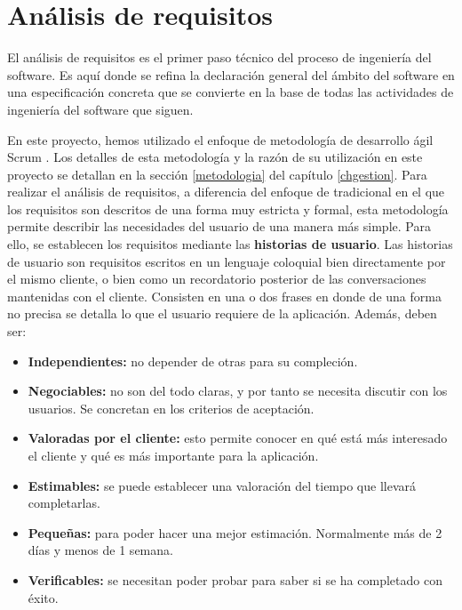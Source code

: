 
\chapter{Análisis de requisitos}
El análisis de requisitos es el primer paso técnico del proceso de ingeniería del software. Es aquí donde se refina la declaración general del ámbito del software en una especificación concreta que se convierte en la base de todas las actividades de ingeniería del software que siguen.

En este proyecto, hemos utilizado el enfoque de metodología de desarrollo ágil Scrum \cite{libroscrum}. Los detalles de esta metodología y la razón de su utilización en este proyecto se detallan en la sección \ref{metodologia} del capítulo \ref{chgestion}. Para realizar el análisis de requisitos, a diferencia del enfoque de tradicional en el que los requisitos son descritos de una forma muy estricta y formal, esta metodología permite describir las necesidades del usuario de una manera más simple. Para ello, se establecen los requisitos mediante las \textbf{historias de usuario}. Las historias de usuario son requisitos escritos en un lenguaje coloquial bien directamente por el mismo cliente, o bien como un recordatorio posterior de las conversaciones mantenidas con el cliente. Consisten en una o dos frases en donde de una forma no precisa se detalla lo que el usuario requiere de la aplicación. Además, deben ser:

\begin{itemize}
\item \textbf{Independientes:} no depender de otras para su compleción.
\item \textbf{Negociables:} no son del todo claras, y por tanto se necesita discutir con los usuarios. Se concretan en los criterios de aceptación.
\item \textbf{Valoradas por el cliente:} esto permite conocer en qué está más interesado el cliente y qué es más importante para la aplicación.
\item \textbf{Estimables:} se puede establecer una valoración del tiempo que llevará completarlas.
\item \textbf{Pequeñas:} para poder hacer una mejor estimación. Normalmente más de 2 días y menos de 1 semana.
\item \textbf{Verificables:} se necesitan poder probar para saber si se ha completado con éxito. 
\end{itemize}

